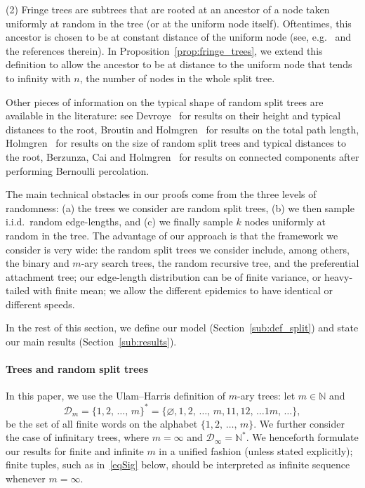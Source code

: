 \documentclass[AHL,Unicode,longabstracts,published]{cedram}
\newcommand{\bbN}{\mathbb{N}}
\newcommand{\clD}{\mathcal{D}}
\begin{document}
(2) Fringe trees are subtrees that are rooted at an ancestor of a node taken uniformly at random in the tree (or at the uniform node itself). Oftentimes, this ancestor is chosen to be at constant distance of the uniform node (see, e.g.~\cite{JansonHolm} and the references therein). In Proposition~\ref{prop:fringe_trees}, we extend this definition to allow the ancestor to be at distance to the uniform node that tends to infinity with $n$, the number of nodes in the whole split tree.

Other pieces of information on the typical shape of random split trees are available in the literature: see Devroye~\cite{devroye-split} for results on their height and typical distances to the root, Broutin and Holmgren~\cite{BH12} for results on the total path length, Holmgren~\cite{Holmgren12} for results on the size of random split trees and typical distances to the root, Berzunza, Cai and Holmgren~\cite{BCH19, berzunza2021asymptotic} for results on connected components after performing Bernoulli percolation.

The main technical obstacles in our proofs come from the three levels of randomness: (a) the trees we consider are random split trees, (b) we then sample i.i.d.\ random edge-lengths, and (c) we finally sample $k$ nodes uniformly at random in the tree. The advantage of our approach is that the framework we consider is very wide: the random split trees we consider include, among others, the binary and $m$-ary search trees, the random recursive tree, and the preferential attachment tree; our edge-length distribution can be of finite variance, or heavy-tailed with finite mean; we allow the different epidemics to have identical or different speeds.

In the rest of this section, we define our model (Section~\ref{sub:def_split}) and state our main results (Section~\ref{sub:results}).


\paragraph*{Trees and random split trees}\label{sub:def_split}

In this paper, we use the Ulam--Harris definition of $m$-ary trees: let $m\in\bbN$ and
\[
\clD_m = \{1, 2,\, \ldots,\, m\}^* = \{\varnothing, 1, 2, \,\ldots,\, m, 11, 12,\, \ldots 1m,\, \ldots\},
\]
be the set of all finite words on the alphabet $\{1, 2, \,\ldots,\, m\}$. We further consider the case of infinitary trees, where $m=\infty$ and $\clD_\infty = \bbN^*$. We henceforth formulate our results for finite and infinite $m$ in a unified fashion (unless stated explicitly); finite tuples, such as in~\eqref{eqSig} below, should be interpreted as infinite sequence whenever $m=\infty$.
\end{document}
